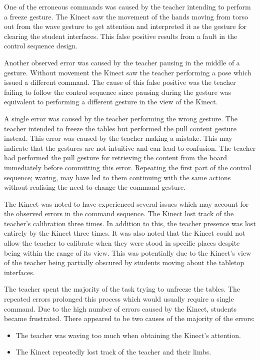 \documentclass[link]{IWCOMP}
\begin{document}
One of the erroneous commands was caused by the teacher intending to perform a freeze gesture.
The Kinect saw the movement of the hands moving from torso out from the wave gesture to get attention and interpreted it as the gesture for clearing the student interfaces.
This false positive results from a fault in the control sequence design.

Another observed error was caused by the teacher pausing in the middle of a gesture.
Without movement the Kinect saw the teacher performing a pose which issued a different command.
The cause of this false positive was the teacher failing to follow the control sequence since pausing during the gesture was equivalent to performing a different gesture in the view of the Kinect.

A single error was caused by the teacher performing the wrong gesture.
The teacher intended to freeze the tables but performed the pull content gesture instead. 
This error was caused by the teacher making a mistake.
This may indicate that the gestures are not intuitive and can lead to confusion.
The teacher had performed the pull gesture for retrieving the content from the board immediately before committing this error.
Repeating the first part of the control sequence; waving, may have led to them continuing with the same actions without realising the need to change the command gesture.

The Kinect was noted to have experienced several issues which may account for the observed errors in the command sequence.
The Kinect lost track of the teacher's calibration three times.
In addition to this, the teacher presence was lost entirely by the Kinect three times.
It was also noted that the Kinect could not allow the teacher to calibrate when they were stood in specific places despite being within the range of its view.
This was potentially due to the Kinect's view of the teacher being partially obscured by students moving about the tabletop interfaces.

The teacher spent the majority of the task trying to unfreeze the tables.
The repeated errors prolonged this process which would usually require a single command.
Due to the high number of errors caused by the Kinect, students became frustrated.
There appeared to be two causes of the majority of the errors:

\begin{itemize}
\item The teacher was waving too much when obtaining the Kinect's attention.
\item The Kinect repeatedly lost track of the teacher and their limbs. 
\end{itemize}
\end{document}
